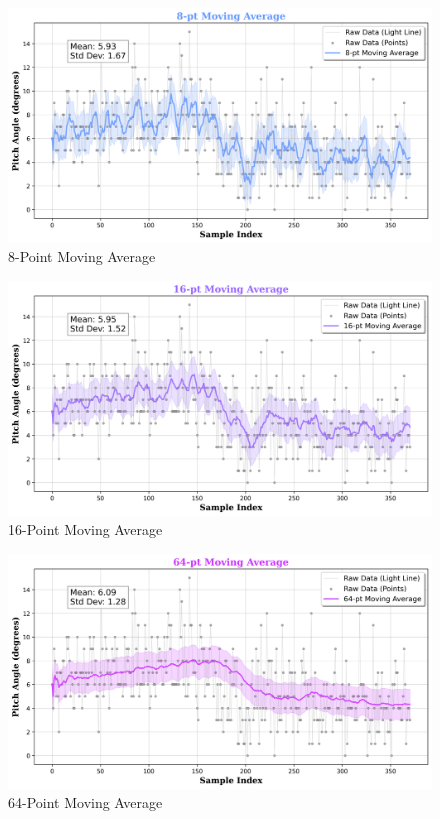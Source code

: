 \documentclass[a4paper,12pt]{article}
\begin{document}
\begin{figure}[H]
    \centering
    \includegraphics[width=1\linewidth]{pitch_analysis_8pt.png}
    \caption{8-Point Moving Average}
    \label{fig:enter-label}
\end{figure}
\begin{figure}[H]
    \centering
    \includegraphics[width=1\linewidth]{pitch_analysis_16pt.png}
    \caption{16-Point Moving Average}
    \label{fig:enter-label}
\end{figure}
\begin{figure}[H]
    \centering
    \includegraphics[width=1\linewidth]{pitch_analysis_64pt.png}
    \caption{64-Point Moving Average}
    \label{fig:enter-label}
\end{figure}
\end{document}
